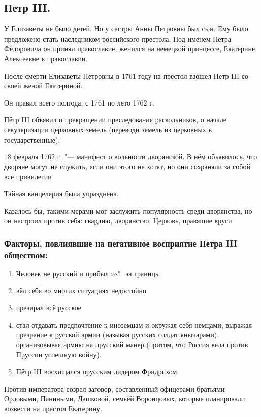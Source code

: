 \subsection{Петр III.}

У Елизаветы не было детей. Но у сестры Анны Петровны был сын. Ему было предложено стать наследником российского престола. Под именем Петра Фёдоровича он принял православие, женился на немецкой принцессе, Екатерине Алексеевне в православии. 

После смерти Елизаветы Петровны в 1761 году на престол взошёл Пётр III со своей женой Екатериной. 

Он правил всего полгода, с 1761 по лето 1762 г. 

Пётр III объявил о прекращении преследования раскольников, о начале секуляризации церковных земель (переводи земель из церковных в государственные). 

18 февраля 1762 г. "--- манифест о вольности дворянской. В нём объявилось, что дворяне могут не служить, если они этого не хотят, но они сохраняли за собой все привилегии

Тайная канцелярия была упразднена.

Казалось бы, такими мерами мог заслужить популярность среди дворянства, но он настроил против себя: гвардию, дворянство, Церковь, правящие круги. 

\subsubsection{Факторы, повлиявшие на негативное восприятие Петра III обществом:}
\begin{enumerate}
    \item{ Человек не русский и прибыл из"=за границы}
    \item{ вёл себя во многих ситуациях недостойно}
    \item{ презирал всё русское}
    \item{ стал отдавать предпочтение к иноземцам и окружая себя немцами, выражая презрение к русской армии (называя русских солдат янычарами), организовывая армию на прусский манер (притом, что Россия вела против Пруссии успешную войну).}
    \item{ Пётр III восхищался прусским лидером Фридрихом.}
\end{enumerate}
Против императора созрел заговор, составленный офицерами братьями Орловыми, Паниными, Дашковой, семьёй Воронцовых, которые планировали возвести на престол Екатерину.

